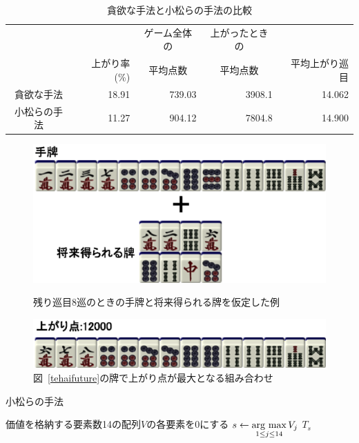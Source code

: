 \begin{table}[t]
	\caption{貪欲な手法と小松らの手法の比較}
	\label{skcomparison}
	\begin{center}
	 \begin{tabular}{|c|r|r|r|r|}
	 	\hline
	 	&             & \multicolumn{1}{c|}{ゲーム全体の} & \multicolumn{1}{c|}{上がったときの} & \\
	 	& 上がり率(\%) & \multicolumn{1}{c|}{平均点数}     & \multicolumn{1}{c|}{平均点数}     & 平均上がり巡目 \\ \hline
	 	貪欲な手法 & 18.91 & 739.03 & 3908.1 & 14.062 \\ \hline 
	 	小松らの手法 & 11.27 & 904.12 & 7804.8 & 14.900\\ \hline
	 \end{tabular}
	\end{center}
\end{table}

\begin{figure}[t]
	\begin{center}
  		\includegraphics{fig/tehaifuture.eps}
	\end{center}
 	\caption{残り巡目8巡のときの手牌と将来得られる牌を仮定した例}
 	\label{tehaifuture}

	\begin{center}
  		\includegraphics{fig/maxcombination.eps}
	\end{center}
 	\caption{図~\ref{tehaifuture}の牌で上がり点が最大となる組み合わせ}
 	\label{maxcombination}
\end{figure}

\begin{algorithm}[t]
\caption{小松らの手法}
\label{komatu}
	価値を格納する要素数14の配列$V$の各要素を0にする\;
	$s \leftarrow \mathop{\rm arg~max}\limits_{1 \le j \le 14} V_j$\;
	\Return $T_s$\;
\end{algorithm}

